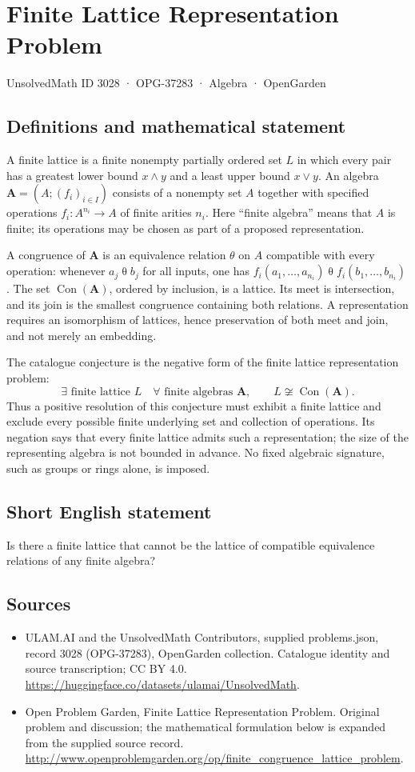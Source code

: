 \documentclass[11pt,a4paper]{article}
\begin{document}
\section*{Finite Lattice Representation Problem}\label{3028}
{\small UnsolvedMath ID 3028 · OPG-37283 · Algebra · OpenGarden}
\subsection{Definitions and mathematical statement}
A finite lattice is a finite nonempty partially ordered set $L$ in which every
pair has a greatest lower bound $x\wedge y$ and a least upper bound $x\vee y$.
An algebra $\mathbf A=(A;(f_i)_{i\in I})$ consists of a nonempty set $A$ together
with specified operations $f_i:A^{n_i}\to A$ of finite arities $n_i$.
Here ``finite algebra'' means that $A$ is finite; its operations may be chosen
as part of a proposed representation.

A congruence of $\mathbf A$ is an equivalence relation $\theta$ on $A$ compatible
with every operation: whenever $a_j\mathrel\theta b_j$ for all inputs, one has
$f_i(a_1,\ldots,a_{n_i})\mathrel\theta f_i(b_1,\ldots,b_{n_i})$.
The set $\operatorname{Con}(\mathbf A)$, ordered by inclusion, is a lattice.
Its meet is intersection, and its join is the smallest congruence containing
both relations. A representation requires an isomorphism of lattices, hence
preservation of both meet and join, and not merely an embedding.

The catalogue conjecture is the negative form of the finite lattice
representation problem:
\[
 \exists\text{ finite lattice }L\quad
 \forall\text{ finite algebras }\mathbf A,\qquad
 L\not\cong\operatorname{Con}(\mathbf A).
\]
Thus a positive resolution of this conjecture must exhibit a finite lattice
and exclude every possible finite underlying set and collection of operations.
Its negation says that every finite lattice admits such a representation;
the size of the representing algebra is not bounded in advance. No fixed
algebraic signature, such as groups or rings alone, is imposed.
\subsection{Short English statement}
Is there a finite lattice that cannot be the lattice of compatible equivalence relations of any finite algebra?
\subsection{Sources}
\begin{itemize}
\item[S1] ULAM.AI and the UnsolvedMath Contributors, supplied problems.json, record 3028 (OPG-37283), OpenGarden collection. Catalogue identity and source transcription; CC BY 4.0.
\url{https://huggingface.co/datasets/ulamai/UnsolvedMath}.
\item[S2] Open Problem Garden, Finite Lattice Representation Problem. Original problem and discussion; the mathematical formulation below is expanded from the supplied source record.
\url{http://www.openproblemgarden.org/op/finite_congruence_lattice_problem}.
\end{itemize}
\end{document}
